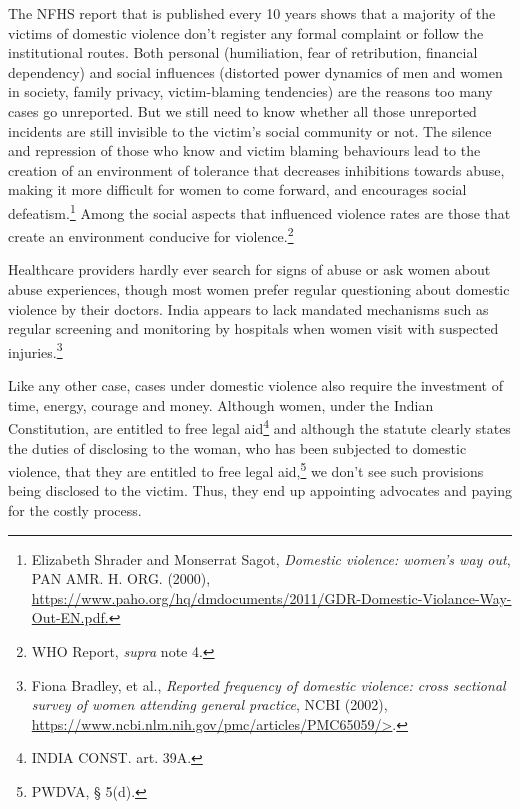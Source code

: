 \begin{multicols}{2}

\noi
The NFHS report that is published every 10 years shows that a majority of the victims of
domestic violence don’t register any formal complaint or follow the institutional routes. Both
personal (humiliation, fear of retribution, financial dependency) and social influences
(distorted power dynamics of men and women in society, family privacy, victim-blaming
tendencies) are the reasons too many cases go unreported. But we still need to know whether
all those unreported incidents are still invisible to the victim's social community or not. The
silence and repression of those who know and victim blaming behaviours lead to the creation
of an environment of tolerance that decreases inhibitions towards abuse, making it more
difficult for women to come forward, and encourages social defeatism.\footnote{Elizabeth Shrader and Monserrat Sagot, \textit{Domestic violence: women’s way out}, PAN AMR. H. ORG. (2000),\\
\url{https://www.paho.org/hq/dmdocuments/2011/GDR-Domestic-Violance-Way-Out-EN.pdf.}} Among the social
aspects that influenced violence rates are those that create an environment conducive for
violence.\footnote{WHO Report, \textit{supra} note 4.}

\noi
Healthcare providers hardly ever search for signs of abuse or ask women about abuse
experiences, though most women prefer regular questioning about domestic violence by their
doctors. India appears to lack mandated mechanisms such as regular screening and
monitoring by hospitals when women visit with suspected injuries.\footnote{Fiona Bradley, et al., \textit{Reported frequency of domestic violence: cross sectional survey of women attending
general practice}, NCBI (2002), \url{https://www.ncbi.nlm.nih.gov/pmc/articles/PMC65059/>}.}


\noi
Like any other case, cases under domestic violence also require the investment of time,
energy, courage and money. Although women, under the Indian Constitution, are entitled to
free legal aid\footnote{INDIA CONST. art. 39A. } and although the statute clearly states the duties of disclosing to the woman, who has been subjected to domestic violence, that they are entitled to free legal aid,\footnote{ PWDVA, § 5(d).} we
don’t see such provisions being disclosed to the victim. Thus, they end up appointing
advocates and paying for the costly process. 


\end{multicols}
